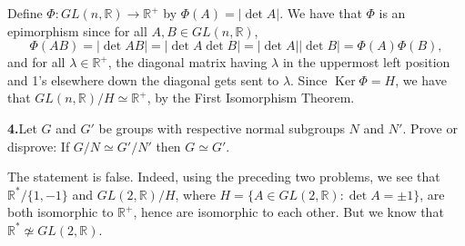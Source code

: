 \documentclass[10pt,]{book}
\theoremstyle{plain}
\theoremstyle{definition}
\theoremstyle{definition}
\theoremstyle{definition}
\theoremstyle{definition}
\numberwithin{equation}{section}
\def\R{\mathbb{R}}
\DeclareMathOperator{\Ker}{Ker}
\begin{document}
\par\smallskip
Define \(\Phi:GL(n,\R)\to \R^+\) by \(\Phi(A)=|\det A|\). We have that \(\Phi\) is an epimorphism since for all \(A,B\in GL(n,\R)\),%
\begin{equation*}
\Phi(AB)=|\det AB|=|\det A \det B|=|\det
A||\det B|=\Phi(A)\Phi(B),
\end{equation*}
and for all \(\lambda \in \R^+\), the diagonal matrix having \(\lambda\) in the uppermost left position and 1's elsewhere down the diagonal gets sent to \(\lambda\). Since \(\Ker
\Phi=H\), we have that \(GL(n,\R)/H \simeq \R^+\), by the First Isomorphism Theorem.%
\par\smallskip
\noindent\textbf{4.}\quad{}Let \(G\) and \(G'\) be groups with respective normal subgroups \(N\) and \(N'\). Prove or disprove: If \(G/N\simeq G'/N'\) then \(G\simeq
G'\).%
\par\smallskip
The statement is false. Indeed, using the preceding two problems, we see that \(\R^*/\{1,-1\}\) and \(GL(2,\R)/H\), where \(H=\{A\in GL(2,\R):\det A =\pm 1\}\), are both isomorphic to \(\R^+\), hence are isomorphic to each other. But we know that \(\R^* \not\simeq GL(2,\R)\).%
\par\smallskip
\end{document}
